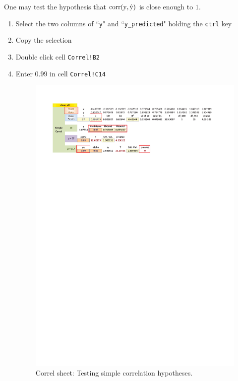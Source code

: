 \documentclass[article]{jss}
\begin{document}
        One may test the hypothesis that $\rm{corr} (y, \hat y)$ is close enough to $1$.
        \begin{enumerate}
          \item Select the two columns of ``\texttt{y}" and ``\texttt{y\_predicted}" holding the \texttt{ctrl} key
          \item Copy the selection
          \item Double click cell \texttt{Correl!B2}
          \item Enter $0.99$ in  cell \texttt{Correl!C14}
          \begin{figure}[!tbh]
            \includegraphics[width=\linewidth, keepaspectratio=true]{img/Correl_simpleCorrel_testing_markup}
            \centering{}\protect\caption{Correl sheet: Testing simple correlation hypotheses.}
          \end{figure}   
        \end{enumerate}
        
\end{document}
